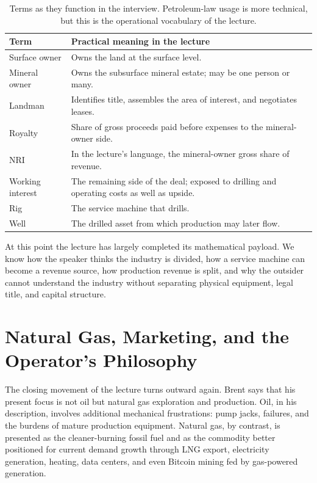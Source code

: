 \begin{table}[h]
\centering
\begin{tabular}{|l|p{8.5cm}|}
\hline
Term & Practical meaning in the lecture \\
\hline
Surface owner & Owns the land at the surface level. \\
Mineral owner & Owns the subsurface mineral estate; may be one person or many. \\
Landman & Identifies title, assembles the area of interest, and negotiates leases. \\
Royalty & Share of gross proceeds paid before expenses to the mineral-owner side. \\
NRI & In the lecture's language, the mineral-owner gross share of revenue. \\
Working interest & The remaining side of the deal; exposed to drilling and operating costs as well as upside. \\
Rig & The service machine that drills. \\
Well & The drilled asset from which production may later flow. \\
\hline
\end{tabular}
\caption{Terms as they function in the interview. Petroleum-law usage is more technical, but this is the operational vocabulary of the lecture.}
\end{table}

At this point the lecture has largely completed its mathematical payload. We know how the speaker thinks the industry is divided, how a service machine can become a revenue source, how production revenue is split, and why the outsider cannot understand the industry without separating physical equipment, legal title, and capital structure.

\section{Natural Gas, Marketing, and the Operator's Philosophy}

The closing movement of the lecture turns outward again. Brent says that his present focus is not oil but natural gas exploration and production. Oil, in his description, involves additional mechanical frustrations: pump jacks, failures, and the burdens of mature production equipment. Natural gas, by contrast, is presented as the cleaner-burning fossil fuel and as the commodity better positioned for current demand growth through LNG export, electricity generation, heating, data centers, and even Bitcoin mining fed by gas-powered generation.

